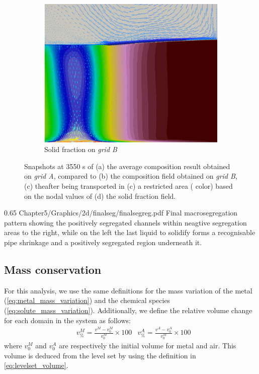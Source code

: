\begin{figure}[H]
\begin{subfigure}[t]{0.4\textwidth}
  \includegraphics[width=\textwidth]{Chapter5/Graphics/2d/1700s_gs_vl.png}
  \caption{Solid fraction on \emph{grid B}}
    \label{fig:1700s_gs}
  \end{subfigure}
\caption{Snapshots at 3550 s of (a) the average composition result obtained on \emph{grid A}, compared to (b) the composition field obtained on \emph{grid B}, 
(c) theafter being transported in (c) a restricted area ( color) based on the nodal values of (d) the solid fraction field.}
\label{fig:W_mask_1700s}
\end{figure}

\begin{figureth}
{0.65}
{Chapter5/Graphics/2d/finalseg/finalsegreg.pdf}
{Final macrosegregation pattern showing the positively segregated channels within neagtive segregation areas to the right,
while on the left the last liquid to solidify forms a recognisable pipe shrinkage and a positively segregated region underneath it.}
\label{fig:smacs_final}
\end{figureth}



\subsection{Mass conservation}

For this analysis, we use the same definitions for the mass variation of the metal (\cref{eq:metal_mass_variation}) and the chemical species (\cref{eq:solute_mass_variation}).
Additionally, we define the relative volume change for each domain in the system as follows:
\begin{align}
\label{eq:volume_variation}
&  v^M_\% = \frac{v^M - v^M_0}{v^M_0} \times 100	
&  v^A_\% = \frac{v^A - v^A_0}{v^M_0} \times 100	
\end{align}
where $v^M_0$ and $v^A_0$ are respectively the initial volume for metal and air. 
This volume is deduced from the level set by using the definition in \cref{eq:levelset_volume}.


